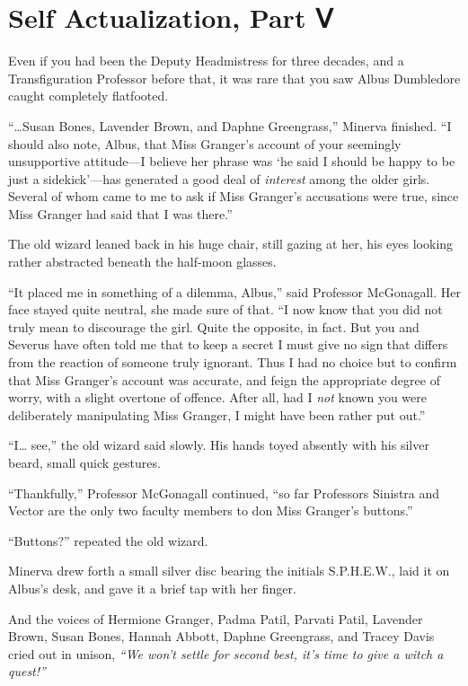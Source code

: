 \chapter{Self Actualization, Part Ⅴ}

Even if you had been the Deputy Headmistress for three decades, and a
Transfiguration Professor before that, it was rare that you saw Albus
Dumbledore caught completely flatfooted.

``\ldots{}Susan Bones, Lavender Brown, and Daphne Greengrass,'' Minerva
finished. ``I should also note, Albus, that Miss Granger's account of
your seemingly unsupportive attitude---I believe her phrase was `he said
I should be happy to be just a sidekick'---has generated a good deal of
\emph{interest} among the older girls. Several of whom came to me to ask
if Miss Granger's accusations were true, since Miss Granger had said
that I was there.''

The old wizard leaned back in his huge chair, still gazing at her, his
eyes looking rather abstracted beneath the half-moon glasses.

``It placed me in something of a dilemma, Albus,'' said Professor
McGonagall. Her face stayed quite neutral, she made sure of that. ``I
now know that you did not truly mean to discourage the girl. Quite the
opposite, in fact. But you and Severus have often told me that to keep a
secret I must give no sign that differs from the reaction of someone
truly ignorant. Thus I had no choice but to confirm that Miss Granger's
account was accurate, and feign the appropriate degree of worry, with a
slight overtone of offence. After all, had I \emph{not} known you were
deliberately manipulating Miss Granger, I might have been rather put
out.''

``I\ldots{} see,'' the old wizard said slowly. His hands toyed absently
with his silver beard, small quick gestures.

``Thankfully,'' Professor McGonagall continued, ``so far Professors
Sinistra and Vector are the only two faculty members to don Miss
Granger's buttons.''

``Buttons?'' repeated the old wizard.

Minerva drew forth a small silver disc bearing the initials S.P.H.E.W.,
laid it on Albus's desk, and gave it a brief tap with her finger.

And the voices of Hermione Granger, Padma Patil, Parvati Patil, Lavender
Brown, Susan Bones, Hannah Abbott, Daphne Greengrass, and Tracey Davis
cried out in unison, \emph{``We won't settle for second best, it's time
to give a witch a quest!''}

